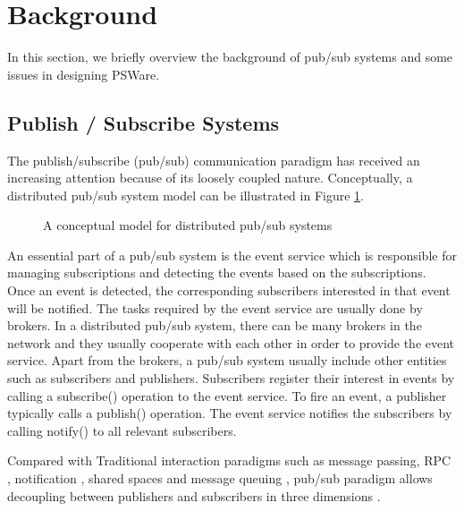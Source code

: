 \section{Background}
\label{sec:background}
In this section, we briefly overview the background of pub/sub systems and some issues in designing PSWare.

\subsection{Publish / Subscribe Systems}
The publish/subscribe (pub/sub) communication paradigm has received an increasing attention because of its loosely coupled nature. Conceptually, a distributed pub/sub system model can be illustrated in Figure \ref{fig:pubsub}.

\begin{figure}
\centering
{}
\caption{A conceptual model for distributed pub/sub systems}
\label{fig:pubsub}
\end{figure}

An essential part of a pub/sub system is the event service which is responsible for managing subscriptions and detecting the events based on the subscriptions. Once an event is detected, the corresponding subscribers interested in that event will be notified. The tasks required by the event service are usually done by brokers. In a distributed pub/sub system, there can be many brokers in the network and they usually cooperate with each other in order to provide the event service. Apart from the brokers, a pub/sub system usually include other entities such as subscribers and publishers. Subscribers register their interest in events by calling a subscribe() operation to the event service. To fire an event, a publisher typically calls a publish() operation. The event service notifies the subscribers by calling notify() to all relevant subscribers.

Compared with Traditional interaction paradigms such as message passing, RPC \cite{rpc}, notification \cite{designpattern}, shared spaces \cite{linda} and message queuing \cite{mom}, pub/sub paradigm allows decoupling between publishers and subscribers in three dimensions \cite{facespubsub}.

